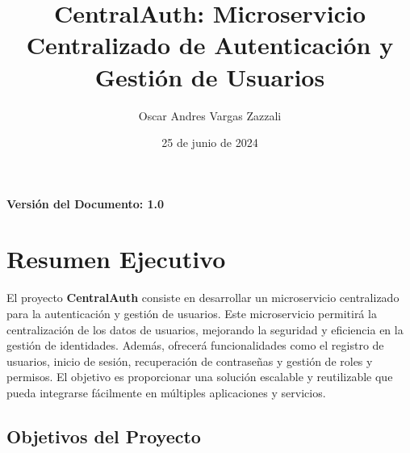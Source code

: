 \documentclass{article}
\title{CentralAuth: Microservicio Centralizado de Autenticación y Gestión de Usuarios}
\author{Oscar Andres Vargas Zazzali}
\date{25 de junio de 2024}
\begin{document}
\maketitle

\begin{center}
    \textbf{Versión del Documento: 1.0}
\end{center}
\newpage
\tableofcontents
\newpage

\section{Resumen Ejecutivo}

El proyecto \textbf{CentralAuth} consiste en desarrollar un microservicio centralizado para la autenticación y gestión de usuarios. Este microservicio permitirá la centralización de los datos de usuarios, mejorando la seguridad y eficiencia en la gestión de identidades. Además, ofrecerá funcionalidades como el registro de usuarios, inicio de sesión, recuperación de contraseñas y gestión de roles y permisos. El objetivo es proporcionar una solución escalable y reutilizable que pueda integrarse fácilmente en múltiples aplicaciones y servicios.

\subsection{Objetivos del Proyecto}
\end{document}
